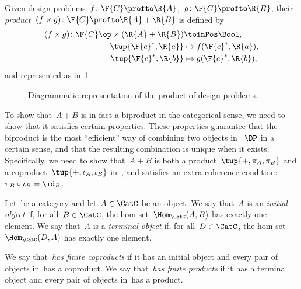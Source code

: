 \begin{definition}
    \label{def:product}
    Given design problems~$f\colon \F{C} \profto \R{A}$,~$g \colon \F{C} \profto \R{B}$, their \emph{product}~$(f \times g)\colon \F{C} \profto \R{A} + \R{B}$ is defined by
    \begin{equation}
        \begin{aligned}
        (f \times g)
            \colon \F{C}\op  \times (\R{A} + \R{B}) & \toinPos \Bool,  \\
            \tup{\F{c}^*, \R{a}} & \mapsto f(\F{c}^*, \R{a}), \\
            \tup{\F{c}^*, \R{b}} & \mapsto g(\F{c}^*, \R{b}),
        \end{aligned}
    \end{equation}
    and represented as in~\cref{fig:productdp}.
\end{definition}

\begin{figure}[h!]
    \begin{center}
    \end{center}
    \caption{Diagrammatic representation of the product of design problems. \label{fig:productdp}}
\end{figure}


To show that~$A + B$ is in fact a biproduct in the categorical sense, we need to show that it satisfies certain properties. These properties guarantee that the biproduct is the most ``efficient'' way of combining two objects in~$~\DP$ in a certain sense, and that the resulting combination is unique when it exists. Specifically, we need to show that~$A + B$ is both a product~$\tup{+, \pi_A, \pi_B}$ and a coproduct~$\tup{+, \iota_A, \iota_B}$ in~\DP, and satisfies an extra coherence condition:~$\pi_B \circ \iota_B = \id_B$.

\begin{ctdefinition}
    Let~\CatC be a category and let~$A \in \CatC$ be an object. We say that~$A$ is an \emph{initial object} if, for all~$B \in\CatC$, the hom-set~$\Hom_\CatC(A,B)$ has exactly one element. We say that~$A$ is a \emph{terminal object} if, for all~$D\in\CatC$, the hom-set~$\Hom_\CatC(D,A)$ has exactly one element.
\end{ctdefinition}

\begin{ctdefinition}
    We say that~\CatC \emph{has finite coproducts} if it has an initial object and every pair of objects in~\CatC has a coproduct.
    We say that~\CatC \emph{has finite products} if it has a terminal object and every pair of objects in~\CatC has a product.
\end{ctdefinition}

